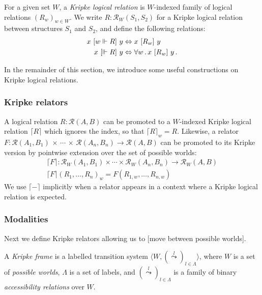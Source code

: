 \begin{definition}
For a given set $W$,
a \emph{Kripke logical relation} is
$W$-indexed family of logical relations $(R_w)_{w \in W}$.
We write $R : \mathcal{R}_W(S_1, S_2)$
for a Kripke logical relation between structures $S_1$ and $S_2$,
and define the following relations:
\begin{align*}
  x \ [{w \Vdash R}]\  y &\Leftrightarrow x \ [{R_w}]\  y \\
  x \ [{\Vdash R}]\  y &\Leftrightarrow \forall w \,.\, x \ [{R_w}]\  y \,.
\end{align*}
\end{definition}

In the remainder of this section,
we introduce some useful constructions on
Kripke logical relations.

\subsubsection{Kripke relators}

A logical relation $R : \mathcal{R}(A, B)$
can be promoted to a $W$-indexed Kripke logical relation $\lceil R \rceil$
which ignores the index, so that $\lceil R \rceil_w = R$.
Likewise,
a relator
  $F : \mathcal{R}(A_1, B_1) \,\times\,\cdots\,\times\,\mathcal{R}(A_n, B_n) \rightarrow \mathcal{R}(A, B)$
can be promoted to its Kripke version
by pointwise extension over the set of possible worlds:
\begin{gather*}
  \lceil F \rceil : \mathcal{R}_W(A_1, B_1) \times \cdots \times \mathcal{R}_W(A_n, B_n) \rightarrow \mathcal{R}_W(A, B) \\
  \lceil F \rceil (R_1, \ldots, R_n)_w = F(R_{1,w}, \ldots, R_{n,w})
\end{gather*}
We use $\lceil - \rceil$ implicitly
when a relator appears in a context where
a Kripke logical relation is expected.

\subsubsection{Modalities}

Next we define Kripke relators
allowing us to [move between possible worlds].

\begin{definition}
A \emph{Kripke frame}
is a labelled transition system
$\langle W, (\stackrel{l}{\leadsto})_{l \in \Lambda} \rangle$, where
$W$ is a set of \emph{possible worlds},
$\Lambda$ is a set of labels, and
$(\stackrel{l}{\leadsto})_{l \in \Lambda}$ is a family of
binary \emph{accessibility relations} over $W$.
\end{definition}

